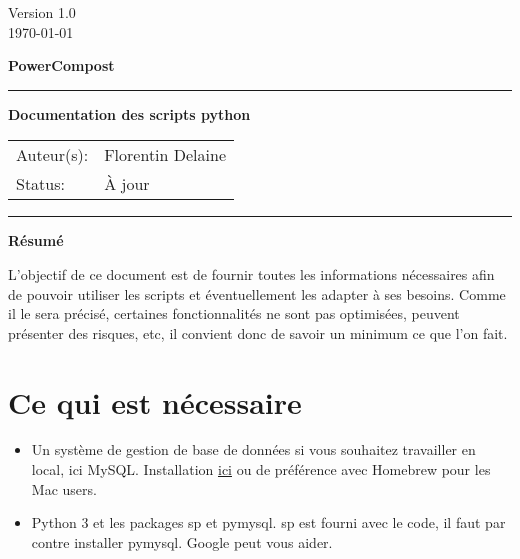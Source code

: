 \documentclass{MyReportClass}
\begin{document}

\begingroup

\setlength{\parindent}{0pt}
\thispagestyle{empty}

\begin{flushright}
	Version 1.0\\
	\today
\end{flushright}

{\Large \bf PowerCompost}

\vspace{0.2in}
\hrule

\vspace{0.2in}
{\Large \bf Documentation des scripts python} \\
\vspace{0.5in}

\begin{tabular}{ll}
	Auteur(s):   & Florentin Delaine\\
	Status:      & À jour\\
\end{tabular}

\vspace{0.2in}
\hrule
\vspace{0.5in}

\endgroup


\begin{center}
{\bf Résumé}
\end{center}

L'objectif de ce document est de fournir toutes les informations nécessaires afin de pouvoir utiliser les scripts et éventuellement les adapter à ses besoins. Comme il le sera précisé, certaines fonctionnalités ne sont pas optimisées, peuvent présenter des risques, etc, il convient donc de savoir un minimum ce que l'on fait.


\clearpage

\tableofcontents

\clearpage


\section{Ce qui est nécessaire}
\begin{itemize}
\item Un système de gestion de base de données si vous souhaitez travailler en local, ici MySQL. Installation \href{http://fr.openclassrooms.com/informatique/cours/administrez-vos-bases-de-donnees-avec-mysql}{ici} ou de préférence avec Homebrew pour les Mac users.
\item Python 3 et les packages sp et pymysql. sp est fourni avec le code, il faut par contre installer pymysql. Google peut vous aider.
\end{itemize}
\end{document}
